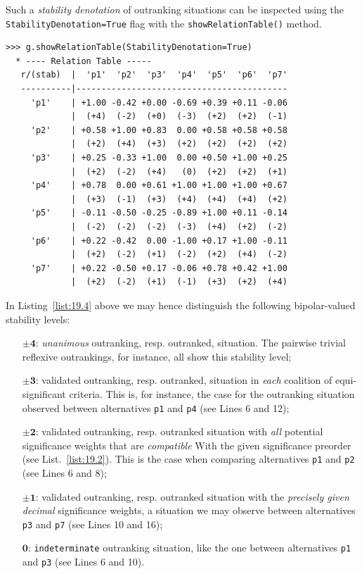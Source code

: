 Such a \emph{stability denotation} of outranking situations can be inspected using the \texttt{StabilityDenotation=True} flag  with the \texttt{showRelation\-Table()} method.
\begin{lstlisting}[caption={Bipolar-valued outranking relation table with stability denotation},label=list:19.4]
>>> g.showRelationTable(StabilityDenotation=True)
  * ---- Relation Table -----
   r/(stab)  |  'p1'  'p2'  'p3'  'p4'  'p5'  'p6'  'p7'   
   ----------|------------------------------------------
     'p1'    | +1.00 -0.42 +0.00 -0.69 +0.39 +0.11 -0.06  
             |  (+4)  (-2)  (+0)  (-3)  (+2)  (+2)  (-1)  
     'p2'    | +0.58 +1.00 +0.83  0.00 +0.58 +0.58 +0.58  
             |  (+2)  (+4)  (+3)  (+2)  (+2)  (+2)  (+2)  
     'p3'    | +0.25 -0.33 +1.00  0.00 +0.50 +1.00 +0.25  
             |  (+2)  (-2)  (+4)   (0)  (+2)  (+2)  (+1)  
     'p4'    | +0.78  0.00 +0.61 +1.00 +1.00 +1.00 +0.67  
             |  (+3)  (-1)  (+3)  (+4)  (+4)  (+4)  (+2)  
     'p5'    | -0.11 -0.50 -0.25 -0.89 +1.00 +0.11 -0.14  
             |  (-2)  (-2)  (-2)  (-3)  (+4)  (+2)  (-2)  
     'p6'    | +0.22 -0.42  0.00 -1.00 +0.17 +1.00 -0.11
             |  (+2)  (-2)  (+1)  (-2)  (+2)  (+4)  (-2)  
     'p7'    | +0.22 -0.50 +0.17 -0.06 +0.78 +0.42 +1.00  
             |  (+2)  (-2)  (+1)  (-1)  (+3)  (+2)  (+4)  
\end{lstlisting}

In Listing~\ref{list:19.4} above we may hence distinguish the following bipolar-valued stability levels:
\begin{itemize}[leftmargin=1cm]
\item [$\mathbf{\pm 4}$:] \emph{unanimous} outranking, resp. outranked, situation. The pairwise trivial reflexive outrankings, for instance, all show this stability level;
\item [$\mathbf{\pm 3}$:] validated outranking, resp. outranked, situation in \emph{each} coalition of equi-significant criteria. This is, for instance, the case for the outranking situation observed between alternatives \texttt{p1} and \texttt{p4} (see Lines 6 and 12);
\item [$\mathbf{\pm 2}$:] validated outranking, resp. outranked situation with \emph{all} potential significance weights that are \emph{compatible} With the given significance preorder (see List.~\vref{list:19.2}). This is the case when comparing alternatives \texttt{p1} and \texttt{p2} (see Lines 6 and 8);
\item [$\mathbf{\pm 1}$:] validated outranking, resp. outranked situation with the \emph{precisely given decimal} significance weights, a situation we may observe between alternatives \texttt{p3} and \texttt{p7} (see Lines 10 and 16);
\item [$\mathbf{0}$:] \texttt{indeterminate} outranking situation, like the one between alternatives \texttt{p1} and \texttt{p3} (see Lines 6 and 10).
\end{itemize}

